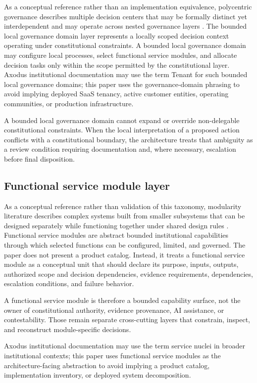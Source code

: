 \documentclass[11pt]{article}
\begin{document}
As a conceptual reference rather than an implementation equivalence,
polycentric governance describes multiple decision centers that may be
formally distinct yet interdependent and may operate across nested governance
layers \citep{ostrom2010beyond}.
The bounded local governance domain layer represents a locally scoped
decision context operating under constitutional constraints. A bounded local
governance domain may configure local processes, select functional service
modules, and allocate decision tasks only within the scope permitted by the
constitutional layer. Axodus institutional documentation may use the term
Tenant for such bounded local governance domains; this paper uses the
governance-domain phrasing to avoid implying deployed SaaS tenancy, active
customer entities, operating communities, or production infrastructure.

A bounded local governance domain cannot expand or override non-delegable
constitutional constraints. When the local interpretation of a proposed
action conflicts with a constitutional boundary, the architecture treats that
ambiguity as a review condition requiring documentation and, where
necessary, escalation before final disposition.

\subsection{Functional service module layer}

As a conceptual reference rather than validation of this taxonomy, modularity
literature describes complex systems built from smaller subsystems that can be
designed separately while functioning together under shared design rules
\citep{baldwin2000design}.
Functional service modules are abstract bounded institutional capabilities
through which selected functions can be configured, limited, and governed.
The paper does not present a product catalog. Instead, it treats a
functional service module as a conceptual unit that should declare its
purpose, inputs, outputs, authorized scope and decision dependencies, evidence requirements,
dependencies, escalation conditions, and failure behavior.

A functional service module is therefore a bounded capability surface, not
the owner of constitutional authority, evidence provenance, AI assistance,
or contestability. Those remain separate cross-cutting layers that
constrain, inspect, and reconstruct module-specific decisions.

Axodus institutional documentation may use the term service nuclei in broader
institutional contexts; this paper uses functional service modules as the
architecture-facing abstraction to avoid implying a product catalog,
implementation inventory, or deployed system decomposition.
\end{document}
